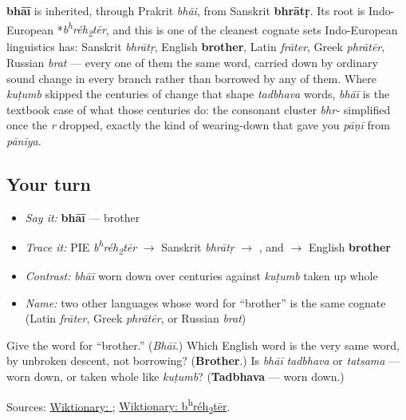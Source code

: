 \begin{cousinweb}
\textbf{bhāī} is inherited, through Prakrit \emph{bhāi}, from Sanskrit \textbf{bhrātṛ}. Its root is Indo-European *\emph{b\textsuperscript{h}réh\textsubscript{2}tēr}, and this is one of the cleanest cognate sets Indo-European linguistics has: Sanskrit \emph{bhrātṛ}, English \textbf{brother}, Latin \emph{frāter}, Greek \emph{phrātēr}, Russian \emph{brat} — every one of them the same word, carried down by ordinary sound change in every branch rather than borrowed by any of them. Where \emph{kuṭumb} skipped the centuries of change that shape \emph{tadbhava} words, \emph{bhāī} is the textbook case of what those centuries do: the consonant cluster \emph{bhr-} simplified once the \emph{r} dropped, exactly the kind of wearing-down that gave you \emph{pāṇī} from \emph{pānīya}.
\end{cousinweb}

\subsection*{Your turn}
\begin{itemize}
\raggedright
  \item \emph{Say it:} \textbf{bhāī} — brother
  \item \emph{Trace it:} PIE \emph{b\textsuperscript{h}réh\textsubscript{2}tēr} $\to$ Sanskrit \emph{bhrātṛ} $\to$ \textbf{}, and $\to$ English \textbf{brother}
  \item \emph{Contrast:} \emph{bhāī} worn down over centuries against \emph{kuṭumb} taken up whole
  \item \emph{Name:} two other languages whose word for \textquotedblleft{}brother\textquotedblright{} is the same cognate (Latin \emph{frāter}, Greek \emph{phrātēr}, or Russian \emph{brat})
\end{itemize}

\begin{tcolorbox}[breakable,colback=teal!4,colframe=teal!35!black,title={Before you move on}]
Give the word for \textquotedblleft{}brother.\textquotedblright{} (\emph{Bhāī}.) Which English word is the very same word, by unbroken descent, not borrowing? (\textbf{Brother}.) Is \emph{bhāī} \emph{tadbhava} or \emph{tatsama} — worn down, or taken whole like \emph{kuṭumb}? (\textbf{Tadbhava} — worn down.)

Sources: \href{https://en.wiktionary.org/wiki/\%E0\%AA\%AD\%E0\%AA\%BE\%E0\%AA\%88}{Wiktionary: }; \href{https://en.wiktionary.org/wiki/Reconstruction:Proto-Indo-European/b\%CA\%B0r\%C3\%A9h\%E2\%82\%82t\%C4\%93r}{Wiktionary: b\textsuperscript{h}réh\textsubscript{2}tēr}.
\end{tcolorbox}
